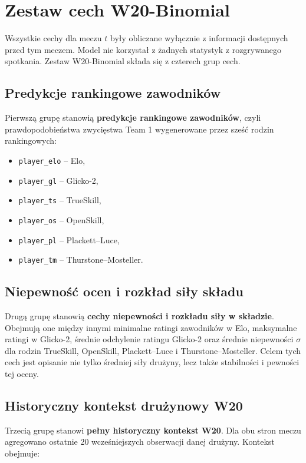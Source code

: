 \section{Zestaw cech W20-Binomial}

Wszystkie cechy dla meczu $t$ były obliczane wyłącznie z informacji dostępnych przed tym meczem.
Model nie korzystał z żadnych statystyk z rozgrywanego spotkania. Zestaw W20-Binomial składa się z
czterech grup cech.

\subsection{Predykcje rankingowe zawodników}

Pierwszą grupę stanowią \textbf{predykcje rankingowe zawodników}, czyli prawdopodobieństwa
zwycięstwa Team 1 wygenerowane przez sześć rodzin rankingowych:

\begin{itemize}
    \item \texttt{player\_elo} -- Elo,
    \item \texttt{player\_gl} -- Glicko-2,
    \item \texttt{player\_ts} -- TrueSkill,
    \item \texttt{player\_os} -- OpenSkill,
    \item \texttt{player\_pl} -- Plackett--Luce,
    \item \texttt{player\_tm} -- Thurstone--Mosteller.
\end{itemize}

\subsection{Niepewność ocen i rozkład siły składu}

Drugą grupę stanowią \textbf{cechy niepewności i rozkładu siły w składzie}. Obejmują one między
innymi minimalne ratingi zawodników w Elo, maksymalne ratingi w Glicko-2, średnie odchylenie ratingu
Glicko-2 oraz średnie niepewności $\sigma$ dla rodzin TrueSkill, OpenSkill, Plackett--Luce i
Thurstone--Mosteller. Celem tych cech jest opisanie nie tylko średniej siły drużyny, lecz także
stabilności i pewności tej oceny.

\subsection{Historyczny kontekst drużynowy W20}

Trzecią grupę stanowi \textbf{pełny historyczny kontekst W20}. Dla obu stron meczu agregowano
ostatnie 20 wcześniejszych obserwacji danej drużyny. Kontekst obejmuje:

